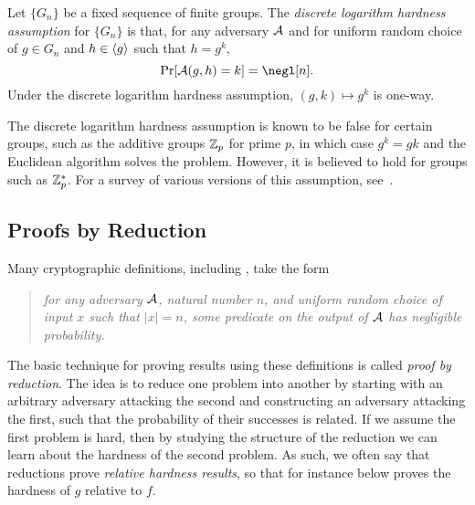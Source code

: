 \begin{ex}
  Let $\{G_n\}$ be a fixed sequence of finite groups. The \emph{discrete logarithm hardness assumption}
  for $\{G_n\}$ is that, for any adversary $\mathcal{A}$ and for uniform random choice of
  $g\in G_n$ and $h\in\langle g\rangle$ such that $h = g^k$, \[
    \Pr[\cA(g,h) = k] = \negl[n].
  \]
  Under the discrete logarithm hardness assumption, $(g,k)\mapsto g^k$ is one-way.

  The discrete logarithm hardness assumption is known to be false for certain groups, such
  as the additive groups $\mathbb{Z}_p$ for prime $p$, in which case $g^k = gk$ and the
  Euclidean algorithm solves the problem. However, it is believed to hold for
  groups such as $\mathbb{Z}^*_p$. For a survey of various versions of this assumption,
  see~\cite{sadeghi-steinerr-2002}.
\end{ex}

\subsection{Proofs by Reduction}

Many cryptographic definitions, including ,
take the form \begin{quote}\emph{for any adversary $\mathcal{A}$, natural number $n$, and uniform
random choice of input $x$ such that $|x| = n$, some predicate on the output
of $\mathcal{A}$ has negligible probability.}\end{quote} The basic technique for proving results
using these definitions is called \emph{proof by reduction}. The idea is to
reduce one problem into another by starting with an arbitrary adversary
attacking the second and constructing an adversary attacking the first,
such that the probability of their successes is related. If we assume the first
problem is hard, then by studying the structure of the reduction we can learn
about the hardness of the second problem. As such, we often say that reductions
prove \emph{relative hardness results}, so that for instance 
below proves the hardness of $g$ relative to $f$.


